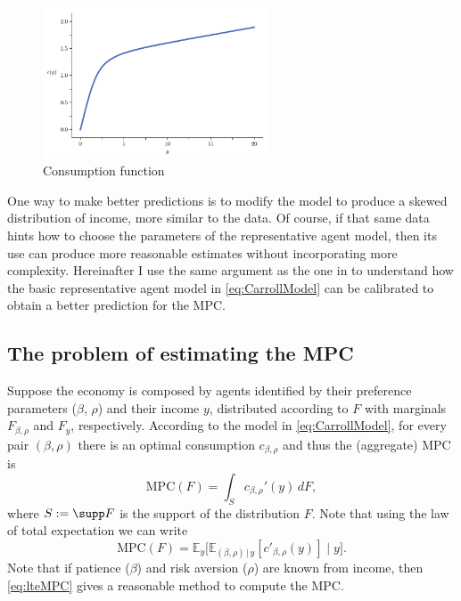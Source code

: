 \documentclass[english, a4paper, 12pt]{article}
\begin{document}
	\begin{figure}[H]
		\caption{Consumption function}
		\label{fig:concaveC}
		\includegraphics[width=0.6\textwidth]{CarrollCons}
		\vspace{-1ex}
	\end{figure}
\vfill
\newpage	
One way to make better predictions is to modify the model to produce a skewed distribution of income, more similar to the data. Of course, if that same data hints how to choose the parameters of the representative agent model, then its use can produce more reasonable estimates without incorporating more complexity. Hereinafter I use the same argument as the one in  to understand how the basic representative agent model in \eqref{eq:CarrollModel} can be calibrated to obtain a better prediction for the MPC.

\subsection{The problem of estimating the MPC}
Suppose the economy is composed by agents identified by their preference parameters ($\beta$, $\rho$) and their income $y$, distributed according to $F$ with marginals $F_{\beta, \rho}$ and $F_{y}$, respectively. According to the model in \eqref{eq:CarrollModel}, for every pair $(\beta,\rho)$ there is an optimal consumption $c_{\beta,\rho}$ and thus the (aggregate) MPC is 
	$$ \mathrm{MPC}(F) = \int_{S} c_{\beta,\rho}'(y) \, dF, $$
where $S := \supp F$ is the support of the distribution $F$. Note that using the law of total expectation we can write
	\begin{equation} \label{eq:lteMPC}
		\mathrm{MPC}(F) = \mathbb{E}_{y}\Big[ \mathbb{E}_{(\beta,\rho) \, | \, y}[c'_{\beta,\rho}(y)] \; \Big| \; y \Big].
	\end{equation}
Note that if patience ($\beta$) and risk aversion ($\rho$) are known from income, then \eqref{eq:lteMPC} gives a reasonable method to compute the MPC.
\end{document}
